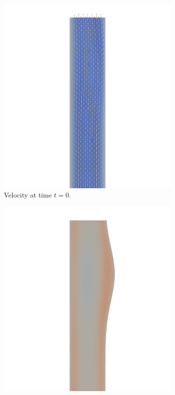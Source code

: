 \documentclass[a4paper,11pt,oneside]{book}
\begin{document}
\begin{figure}[h!] 
  \begin{subfigure}[b]{0.5\linewidth}
    \centering
    \includegraphics[width=1.2\linewidth]{images/velocity_50_0.png} 
        \centering
    \caption{Velocity at time $t = 0$.} 
    \label{fig3:a} 
    \vspace{4ex}
  \end{subfigure}%
  \begin{subfigure}[b]{0.5\linewidth}
    \centering
    \includegraphics[width=1.2\linewidth]{images/velocity_50_025.png}

\end{subfigure}
\end{figure}
\end{document}
